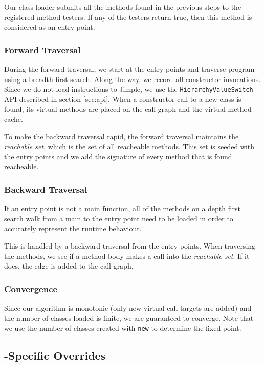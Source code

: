 \documentclass{sigplanconf}
\begin{document}
Our class loader submits all the methods found in the previous steps to the registered method testers. If any of the testers return true, then this method is considered as an entry point.

\subsubsection{Forward Traversal}

During the forward traversal, we start at the entry points and traverse program using a breadth-first search. Along the way, we record all constructor invocations. Since we do not load instructions to Jimple, we use the {\tt HierarchyValueSwitch} API described in section \ref{sec:api}.
When a constructor call to a new class is found, its virtual methods are placed on the call graph and the virtual method cache.

To make the backward traversal rapid, the forward traversal maintains the \emph{reachable set}, which is the set of all reacheable methods. This set is seeded with the entry points and we add the signature of every method that is found reacheable.


\subsubsection{Backward Traversal}
If an entry point is not a main function, all of the methods on a depth first search walk from a main to the entry point need to be loaded in order to accurately represent the runtime behaviour.

This is handled by a backward traversal from the entry points. When traversing the methods, we see if a method body makes a call into the \emph{reachable set}. If it does, the edge is added to the call graph.

\subsubsection{Convergence}

Since our algorithm is monotonic (only new virtual call targets are added) and the number of classes loaded is finite, we are guaranteed to converge. Note that we use the number of classes created with {\tt new} to determine the fixed point.

\subsection{\rb{}-Specific Overrides}
\label{sec:followtosig}
\end{document}
